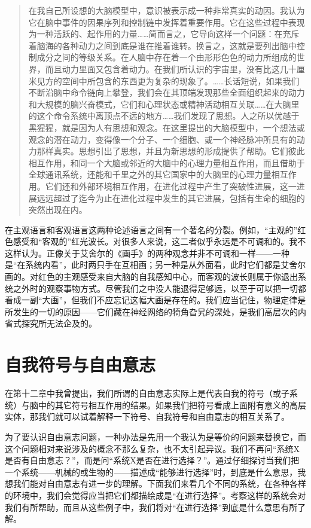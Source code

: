 \begin{quote}
在我自己所设想的大脑模型中，意识被表示成一种非常真实的动因。我认为它在脑中事件的因果序列和控制链中发挥着重要作用。它在这些过程中表现为一种活跃的、起作用的力量……简而言之，它导向这样一个问题：在充斥着脑海的各种动力之间到底是谁在推着谁转。换言之，这就是要列出脑中控制成分之间的等级关系。在人脑中存在着一个由形形色色的动力所组成的世界，而且动力里面又包含着动力。在我们所认识的宇宙里，没有比这几十厘米见方的空间中所包含的东西更为复杂的现象了。……长话短说，如果我们不断沿脑中命令链向上攀登，我们会在其顶端发现那些全面组织起来的动力和大规模的脑兴奋模式，它们和心理状态或精神活动相互关联……在大脑里的这个命令系统中离顶点不远的地方……我们发现了思想。人之所以优越于黑猩猩，就是因为人有思想和观念。在这里提出的大脑模型中，一个想法或观念的潜在动力，变得像一个分子、一个细胞、或一个神经脉冲所具有的动力那样真实。思想引出了思想，并且为新思想的形成提供了帮助。它们彼此相互作用，和同一个大脑或邻近的大脑中的心理力量相互作用，而且借助于全球通讯系统，还能和千里之外的其它国家中的大脑里的心理力量相互作用。它们还和外部环境相互作用，在进化过程中产生了突破性进展，这一进展远远超过了迄今为止在进化过程中发生的其它进展，包括有生命的细胞的突然出现在内。
\end{quote}

在主观语言和客观语言这两种论述语言之间有一个著名的分裂。例如，“主观的”红色感受和“客观的”红光波长。对很多人来说，这二者似乎永远是不可调和的。我不这样认为。正像关于艾舍尔的《画手》的两种观念并非不可调和一样——一种是“在系统内看”，此时两只手在互相画；另一种是从外面看，此时它们都是艾舍尔画的。对红色的主观感受来自大脑的自我感知中心，而客观的波长则属于你退出系统之外时的观察事物方式。尽管我们之中没人能退得足够远，以至于可以把一切都看成一副“大画”，但我们不应忘记这幅大画是存在的。我们应当记住，物理定律是所发生的一切的原因——它们藏在神经网络的犄角旮旯的深处，是我们高层次的内省式探究所无法企及的。

\section{自我符号与自由意志}

在第十二章中我曾提出，我们所谓的自由意志实际上是代表自我的符号（或子系统）与脑中的其它符号相互作用的结果。如果我们把符号看成上面附有意义的高层实体，那我们就可以试着解释一下符号、自我符号和自由意志的相互关系了。

为了要认识自由意志问题，一种办法是先用一个我认为是等价的问题来替换它，而这个问题相对来说涉及的概念不那么复杂，也不太引起异议。我们不再问“系统X是否有自由意志？”，而是问“系统X是否在进行选择？”。通过仔细探讨当我们把一个系统——机械的或生物的——描述成“能够进行选择”时，到底是什么意思，我想我们能对自由意志有进一步的理解。下面我们来看几个不同的系统，在各种各样的环境中，我们会觉得应当把它们都描绘成是“在进行选择”。考察这样的系统会对我们有所帮助，而且从这些例子中，我们将对“在进行选择”到底是什么意思有所了解。

